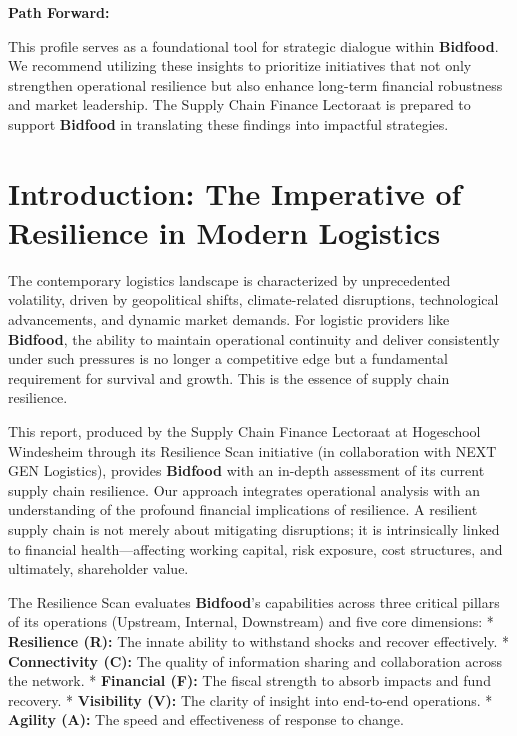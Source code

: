 \documentclass[
  oneside,
  open=any,
  fontsize=11pt]{scrbook}
\begin{document}
\textbf{Path Forward:}

This profile serves as a foundational tool for strategic dialogue within
\textbf{Bidfood}. We recommend utilizing these insights to prioritize
initiatives that not only strengthen operational resilience but also
enhance long-term financial robustness and market leadership. The Supply
Chain Finance Lectoraat is prepared to support \textbf{Bidfood} in
translating these findings into impactful strategies.

\newpage

\chapter{Introduction: The Imperative of Resilience in Modern
Logistics}\label{introduction-the-imperative-of-resilience-in-modern-logistics}

The contemporary logistics landscape is characterized by unprecedented
volatility, driven by geopolitical shifts, climate-related disruptions,
technological advancements, and dynamic market demands. For logistic
providers like \textbf{Bidfood}, the ability to maintain operational
continuity and deliver consistently under such pressures is no longer a
competitive edge but a fundamental requirement for survival and growth.
This is the essence of supply chain resilience.

This report, produced by the Supply Chain Finance Lectoraat at
Hogeschool Windesheim through its Resilience Scan initiative (in
collaboration with NEXT GEN Logistics), provides \textbf{Bidfood} with
an in-depth assessment of its current supply chain resilience. Our
approach integrates operational analysis with an understanding of the
profound financial implications of resilience. A resilient supply chain
is not merely about mitigating disruptions; it is intrinsically linked
to financial health---affecting working capital, risk exposure, cost
structures, and ultimately, shareholder value.

The Resilience Scan evaluates \textbf{Bidfood}'s capabilities across
three critical pillars of its operations (Upstream, Internal,
Downstream) and five core dimensions: * \textbf{Resilience (R):} The
innate ability to withstand shocks and recover effectively. *
\textbf{Connectivity (C):} The quality of information sharing and
collaboration across the network. * \textbf{Financial (F):} The fiscal
strength to absorb impacts and fund recovery. * \textbf{Visibility (V):}
The clarity of insight into end-to-end operations. * \textbf{Agility
(A):} The speed and effectiveness of response to change.
\end{document}
